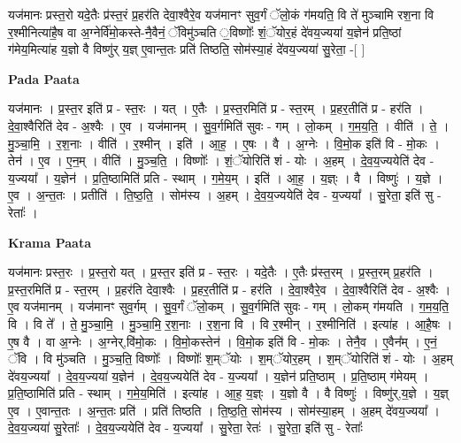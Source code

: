\documentclass[17pt]{extarticle}
\begin{document}
यज॑मानः प्रस्त॒रो यदे॒तैः प्र॑स्त॒रं प्र॒हर॑ति देवा॒श्वैरे॒व यज॑मानꣳ सुव॒र्गं ॅलो॒कं ग॑मयति॒ वि ते॑ मुञ्चामि रश॒ना वि र॒श्मीनित्या॑है॒ष वा अ॒ग्नेर्वि॑मो॒कस्ते-नै॒वैनं॒ ॅविमु॑ञ्चति ॒विष्णोः᳚ शं॒ॅयोर॒हं दे॑वय॒ज्यया॑ य॒ज्ञेन॑ प्रति॒ष्ठां ग॑मेय॒मित्या॑ह य॒ज्ञो वै विष्णु॑र् य॒ज्ञ् ए॒वान्त॒तः प्रति॑ तिष्ठति॒ सोम॑स्या॒हं दे॑वय॒ज्यया॑ सु॒रेता॒ -[ ] \newline

\textbf{Pada Paata} \newline

यज॑मानः । प्र॒स्त॒र इति॑ प्र - स्त॒रः । यत् । ए॒तैः । प्र॒स्त॒रमिति॑ प्र - स्त॒रम् । प्र॒हर॒तीति॑ प्र - हर॑ति । दे॒वा॒श्वैरिति॑ देव - अ॒श्वैः । ए॒व । यज॑मानम् । सु॒व॒र्गमिति॑ सुवः - गम् । लो॒कम् । ग॒म॒य॒ति॒ । वीति॑ । ते॒ । मु॒ञ्चा॒मि॒ । र॒श॒नाः । वीति॑ । र॒श्मीन् । इति॑ । आ॒ह॒ । ए॒षः । वै । अ॒ग्नेः । वि॒मो॒क इति॑ वि - मो॒कः । तेन॑ । ए॒व । ए॒न॒म् । वीति॑ । मु॒ञ्च॒ति॒ । विष्णोः᳚ । शं॒ॅयोरिति॑ शं - योः । अ॒हम् । दे॒व॒य॒ज्ययेति॑ देव - य॒ज्यया᳚ । य॒ज्ञेन॑ । प्र॒ति॒ष्ठामिति॑ प्रति - स्थाम् । ग॒मे॒य॒म् । इति॑ । आ॒ह॒ । य॒ज्ञ्ः । वै । विष्णुः॑ । य॒ज्ञे । ए॒व । अ॒न्त॒तः । प्रतीति॑ । ति॒ष्ठ॒ति॒ । सोम॑स्य । अ॒हम् । दे॒व॒य॒ज्ययेति॑ देव - य॒ज्यया᳚ । सु॒रेता॒ इति॑ सु - रेताः᳚ ।  \newline


\textbf{Krama Paata} \newline

यज॑मानः प्रस्त॒रः । प्र॒स्त॒रो यत् । प्र॒स्त॒र इति॑ प्र - स्त॒रः । यदे॒तैः । ए॒तैः प्र॑स्त॒रम् । प्र॒स्त॒रम् प्र॒हर॑ति । प्र॒स्त॒रमिति॑ प्र - स्त॒रम् । प्र॒हर॑ति देवा॒श्वैः । प्र॒हर॒तीति॑ प्र - हर॑ति । दे॒वा॒श्वैरे॒व । दे॒वा॒श्वैरिति॑ देव - अ॒श्वैः । ए॒व यज॑मानम् । यज॑मानꣳ सुव॒र्गम् । सु॒व॒र्गं ॅलो॒कम् । सु॒व॒र्गमिति॑ सुवः - गम् । लो॒कम् ग॑मयति । ग॒म॒य॒ति॒ वि । वि ते᳚ । ते॒ मु॒ञ्चा॒मि॒ । मु॒ञ्चा॒मि॒ र॒श॒नाः । र॒श॒ना वि । वि र॒श्मीन् । र॒श्मीनिति॑ । इत्या॑ह । आ॒है॒षः । ए॒ष वै । वा अ॒ग्नेः । अ॒ग्नेर्,वि॑मो॒कः । वि॒मो॒कस्तेन॑ । वि॒मो॒क इति॑ वि - मो॒कः । तेनै॒व । ए॒वैन᳚म् । ए॒नं॒ ॅवि । वि मु॑ञ्चति । मु॒ञ्च॒ति॒ विष्णोः᳚ । विष्णोः᳚ श॒म्ॅयोः । श॒म्ॅयोर॒हम् । श॒म्ॅयोरिति॑ शं - योः । अ॒हम् दे॑वय॒ज्यया᳚ । दे॒व॒य॒ज्यया॑ य॒ज्ञेन॑ । दे॒व॒य॒ज्ययेति॑ देव - य॒ज्यया᳚ । य॒ज्ञेन॑ प्रति॒ष्ठाम् । प्र॒ति॒ष्ठाम् ग॑मेयम् । प्र॒ति॒ष्ठामिति॑ प्रति - स्थाम् । ग॒मे॒य॒मिति॑ । इत्या॑ह । आ॒ह॒ य॒ज्ञ्ः । य॒ज्ञो वै । वै विष्णुः॑ । विष्णु॑र्,य॒ज्ञे । य॒ज्ञ् ए॒व । ए॒वान्त॒तः । अ॒न्त॒तः प्रति॑ । प्रति॑ तिष्ठति । ति॒ष्ठ॒ति॒ सोम॑स्य । सोम॑स्या॒हम् । अ॒हम् दे॑वय॒ज्यया᳚ । दे॒व॒य॒ज्यया॑ सु॒रेताः᳚ । दे॒व॒य॒ज्ययेति॑ देव - य॒ज्यया᳚ । सु॒रेता॒ रेतः॑ । सु॒रेता॒ इति॑ सु - रेताः᳚ \newline
\end{document}
